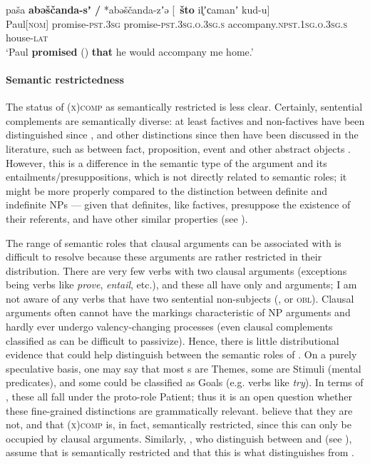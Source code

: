 \documentclass[output=paper]{../langscibook}
\begin{document}
    \ex
    \gll paša \textbf{abəščanda-sʼ /} *abəščanda-zʼə [~\textbf{što} il̥ʼсamanʼ kud-u]\\
    Paul[\textsc{nom}] promise-\textsc{pst.3sg} \phantom{*}promise-\textsc{pst.3sg.o.3sg.s} \phantom{[~}{\COMP} accompany.\textsc{npst.1sg.o.3sg.s} house-\textsc{lat}\\
    \glt `Paul \textbf{promised} (\SUBJ) \textbf{that} he would accompany me home.'
 \z
 
 \paragraph{Semantic restrictedness}
 The status of \textsc{(x)comp} as semantically restric\-ted is less clear. Certainly, sentential complements are semantically diverse: at least factives and non-factives have been distinguished since \citet{kiparsky-kiparsky1970}, and other distinctions since then have been discussed in the literature, such as between fact, proposition, event \citep{peterson1997} and other abstract objects \citep{asher1993}. However, this is a difference in the semantic type of the argument and its entailments/presuppositions, which is not directly related to semantic roles; it might be more properly compared to the distinction between definite and indefinite NPs --- given that definites, like factives, presuppose the existence of their referents, and have other similar properties (see \cite{melvold1991}).
 
 The range of semantic roles that clausal arguments can be associated with is difficult to resolve because these arguments are rather restricted in their distribution. There are very few verbs with two clausal arguments (exceptions being verbs like \textit{prove}, \textit{entail}, etc.), and these all have only \SUBJ and \COMP arguments; I am not aware of any verbs that have two sentential non-subjects (\COMP, \OBJ or \textsc{obl}). Clausal arguments often cannot have the markings characteristic of NP arguments and hardly ever undergo valency-changing processes (even clausal complements classified as \OBJ can be difficult to passivize). Hence, there is little distributional evidence that could help distinguish between the semantic roles of \COMP. On a purely speculative basis, one may say that most {\COMP}s are Themes, some are Stimuli (mental predicates), and some could be classified as Goals (e.g. verbs like \textit{try}). In terms of \citet{Dowty1991}, these all fall under the proto-role Patient; thus it is an open question whether these fine-grained distinctions are grammatically relevant. \citet{zaeneng94} believe that they are not, and that \textsc{(x)comp} is, in fact, semantically restricted, since this \GF can only be occupied by clausal arguments. Similarly, \citet{DL00}, who distinguish between \COMP and \OBJ (see ), assume that \COMP is semantically restricted and that this is what distinguishes \COMP from \OBJ.
 
\end{document}

